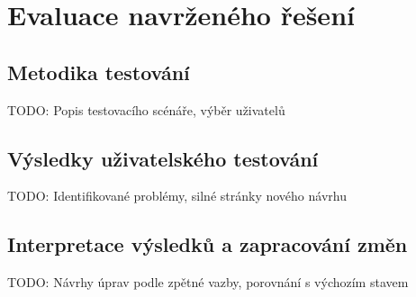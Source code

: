 \chapter{Evaluace navrženého řešení}

\section{Metodika testování}
TODO: Popis testovacího scénáře, výběr uživatelů

\section{Výsledky uživatelského testování}
TODO: Identifikované problémy, silné stránky nového návrhu

\section{Interpretace výsledků a zapracování změn}
TODO: Návrhy úprav podle zpětné vazby, porovnání s výchozím stavem